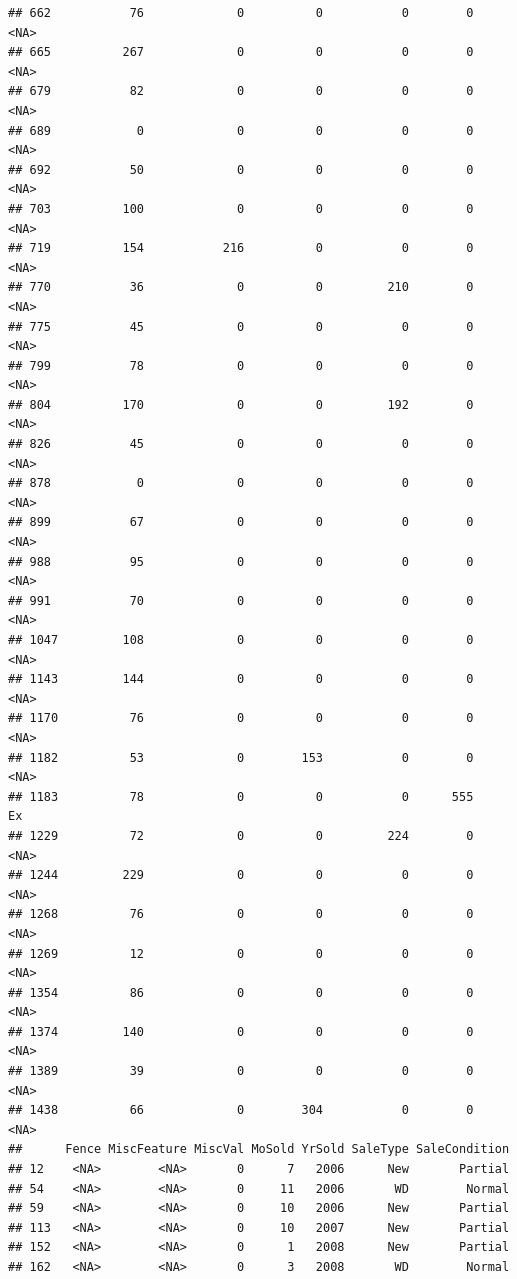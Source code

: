 \documentclass[]{article}
\begin{document}
\begin{verbatim}
## 662           76             0          0           0        0   <NA>
## 665          267             0          0           0        0   <NA>
## 679           82             0          0           0        0   <NA>
## 689            0             0          0           0        0   <NA>
## 692           50             0          0           0        0   <NA>
## 703          100             0          0           0        0   <NA>
## 719          154           216          0           0        0   <NA>
## 770           36             0          0         210        0   <NA>
## 775           45             0          0           0        0   <NA>
## 799           78             0          0           0        0   <NA>
## 804          170             0          0         192        0   <NA>
## 826           45             0          0           0        0   <NA>
## 878            0             0          0           0        0   <NA>
## 899           67             0          0           0        0   <NA>
## 988           95             0          0           0        0   <NA>
## 991           70             0          0           0        0   <NA>
## 1047         108             0          0           0        0   <NA>
## 1143         144             0          0           0        0   <NA>
## 1170          76             0          0           0        0   <NA>
## 1182          53             0        153           0        0   <NA>
## 1183          78             0          0           0      555     Ex
## 1229          72             0          0         224        0   <NA>
## 1244         229             0          0           0        0   <NA>
## 1268          76             0          0           0        0   <NA>
## 1269          12             0          0           0        0   <NA>
## 1354          86             0          0           0        0   <NA>
## 1374         140             0          0           0        0   <NA>
## 1389          39             0          0           0        0   <NA>
## 1438          66             0        304           0        0   <NA>
##      Fence MiscFeature MiscVal MoSold YrSold SaleType SaleCondition
## 12    <NA>        <NA>       0      7   2006      New       Partial
## 54    <NA>        <NA>       0     11   2006       WD        Normal
## 59    <NA>        <NA>       0     10   2006      New       Partial
## 113   <NA>        <NA>       0     10   2007      New       Partial
## 152   <NA>        <NA>       0      1   2008      New       Partial
## 162   <NA>        <NA>       0      3   2008       WD        Normal

\end{verbatim}
\end{document}
